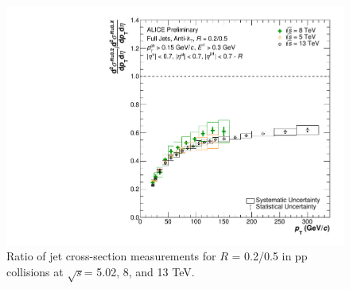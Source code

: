 \documentclass[ALICE]{ALICE_analysis_notes}
\newcommand{\s}{$\sqrt{s}$\xspace}
\newcommand{\pp}{pp\xspace}
\begin{document}
\begin{appendix}
\begin{figure}[h!]
    \centering
    \includegraphics[width=15cm]{figures/EnergyComparisons/RatioComparison_R05.pdf}
    \caption{Ratio of jet cross-section measurements for $R$ = 0.2/0.5 in \pp collisions at \s = 5.02, 8, and 13 TeV.}
    \label{fig:appRatioCompareR05}
\end{figure}
\fi\clearpage{}

\end{appendix}



\end{document}
